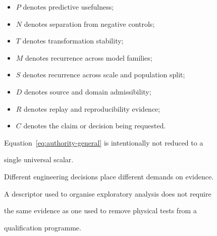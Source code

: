 \documentclass[11pt,a4paper,oneside]{report}
\begin{document}
\begin{itemize}



\item

$P$ denotes predictive usefulness;



\item

$N$ denotes separation from negative controls;



\item

$T$ denotes transformation stability;



\item

$M$ denotes recurrence across model families;



\item

$S$ denotes recurrence across scale and population split;



\item

$D$ denotes source and domain admissibility;



\item

$R$ denotes replay and reproducibility evidence;



\item

$C$ denotes the claim or decision being requested.



\end{itemize}



Equation~\ref{eq:authority-general} is intentionally not reduced to a

single universal scalar.



Different engineering decisions place different demands on evidence.



A descriptor used to organise exploratory analysis does not require

the same evidence as one used to remove physical tests from a

qualification programme.
\end{document}
